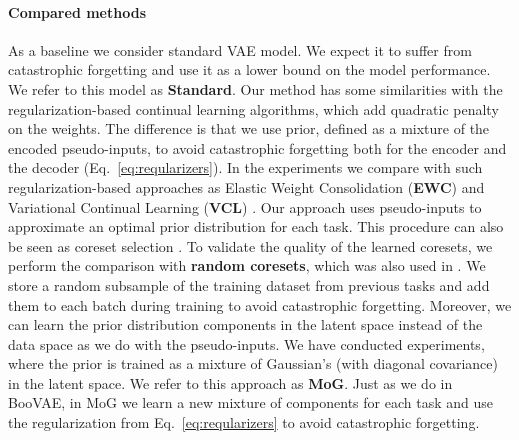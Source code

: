 \paragraph{Compared methods} As a baseline we consider standard VAE model. We expect it to suffer from catastrophic forgetting and use it as a lower bound on the model performance. We refer to this model as \textbf{Standard}.
Our method has some similarities with the regularization-based continual learning algorithms, which add quadratic penalty on the weights. The difference is that we use prior, defined as a mixture of the encoded pseudo-inputs, to avoid catastrophic forgetting both for the encoder and the decoder (Eq.~\ref{eq:reqularizers}). In the experiments we compare with such regularization-based approaches as Elastic Weight Consolidation (\textbf{EWC}) \citep{kirkpatrick2017overcoming} and Variational Continual Learning (\textbf{VCL}) \citep{nguyen2017variational}. 
Our approach uses pseudo-inputs to approximate an optimal prior distribution for each task. This procedure can also be seen as coreset selection \citep{huggins2016coresets, bachem2015coresets}. To validate the quality of the learned coresets, we perform the comparison with \textbf{random coresets}, which was also used in \citep{nguyen2017variational}. We store a random subsample of the training dataset from previous tasks and add them to each batch during training to avoid catastrophic forgetting. 
Moreover, we can learn the prior distribution components in the latent space instead of the data space as we do with the pseudo-inputs. We have conducted experiments, where the prior is trained as a mixture of Gaussian's (with diagonal covariance) in the latent space. We refer to this approach as \textbf{MoG}. Just as we do in BooVAE, in MoG we learn a new mixture of components for each task and use the regularization from Eq.~\ref{eq:reqularizers} to avoid catastrophic forgetting. 


